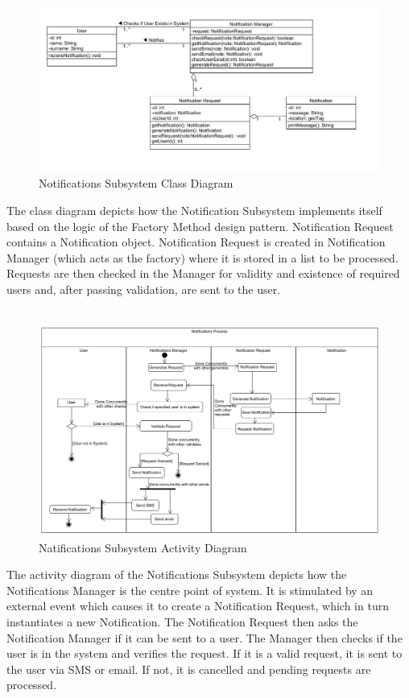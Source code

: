 \documentclass{article}
\begin{document}
				\begin{figure}[h!]
					\includegraphics[scale=0.5]{Diagrams/Class_Diagram_Notifications.JPG}
					\caption{Notifications Subsystem Class Diagram}	
				\end{figure}
				{The class diagram depicts how the Notification Subsystem implements itself based on the logic of the Factory Method design pattern. Notification Request contains a Notification object. Notification Request is created in Notification Manager (which acts as the factory) where it is stored in a list to be processed. Requests are then checked in the Manager for validity and existence of required users and, after passing validation, are sent to the user.\\\\}
			
				\begin{figure}[h!]
					\includegraphics[scale=0.5]{Diagrams/Activity_Diagram_Notifications.JPG}
					\caption{Natifications Subsystem Activity Diagram}	
				\end{figure}
				{The activity diagram of the Notifications Subsystem depicts how the Notifications Manager is the centre point of system. It is stimulated by an external event which causes it to create a Notification Request, which in turn instantiates a new Notification. The Notification Request then asks the Notification Manager if it can be sent to a user. The Manager then checks if the user is in the system and verifies the request. If it is a valid request, it is sent to the user via SMS or email. If not, it is cancelled and pending requests are processed.\\\\}
				
\end{document}

